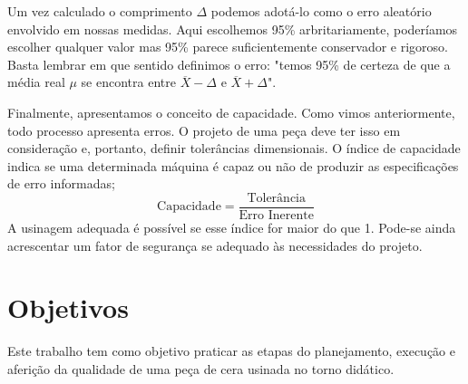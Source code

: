 Um vez calculado o comprimento $\Delta$ podemos adotá-lo como o erro aleatório envolvido em nossas medidas.  Aqui escolhemos 95\% arbritariamente, poderíamos escolher qualquer valor mas 95\% parece suficientemente conservador e rigoroso. Basta lembrar em que sentido definimos o erro:  "temos 95\% de certeza de que a média real $\mu$ se encontra entre $\overline{X} - \Delta$ e $\overline{X} + \Delta$".
 
 

Finalmente, apresentamos o conceito de capacidade. Como vimos anteriormente, todo processo apresenta erros. O projeto
 de uma peça deve ter isso em consideração e, portanto, definir tolerâncias dimensionais. O índice de capacidade indica se 
 uma determinada máquina é capaz ou não de produzir as especificações de erro informadas;
 \begin{equation}
 	\mbox{Capacidade} = \frac{\mbox{Tolerância}}{ \mbox{Erro Inerente}}
 \end{equation}
 A usinagem adequada é possível se esse índice for maior do que 1. Pode-se ainda acrescentar um  fator de segurança se
 adequado às necessidades do projeto.
 
\section{Objetivos}
 Este trabalho tem como objetivo praticar as etapas do planejamento, execução e aferição da qualidade de uma peça de cera usinada no torno
 didático.  
 
